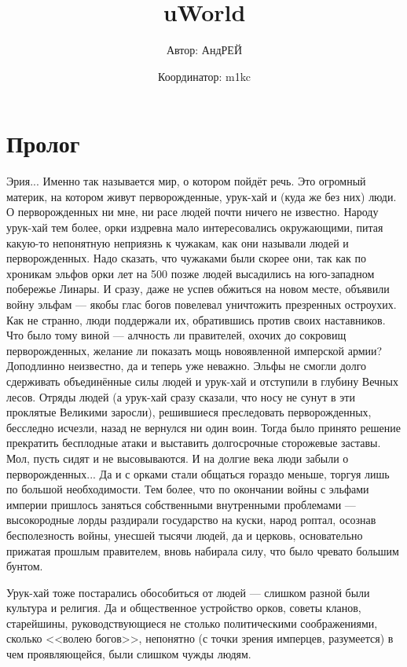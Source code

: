 \documentclass[12pt,a4paper]{book}
\title{\textbf{uWorld}}
\author{Автор: АндРЕЙ \and Координатор: m1kc}
\begin{document}
\maketitle

\chapter*{Пролог}

Эрия... Именно так называется мир, о котором пойдёт речь. Это огромный материк, на котором живут перворожденные, урук-хай и (куда же без них) люди. О перворожденных ни мне, ни расе людей почти ничего не известно. Народу урук-хай тем более, орки издревна мало интересовались окружающими, питая какую-то непонятную неприязнь к чужакам, как они называли людей и перворожденных. Надо сказать, что чужаками были скорее они, так как по хроникам эльфов орки лет на 500 позже людей высадились на юго-западном побережье Линары. И сразу, даже не успев обжиться на новом месте, объявили войну эльфам --- якобы глас богов повелевал уничтожить презренных остроухих. Как не странно, люди поддержали их, обратившись против своих наставников. Что было тому виной --- алчность ли правителей, охочих до сокровищ перворожденных, желание ли показать мощь новоявленной имперской армии? Доподлинно неизвестно, да и теперь уже неважно. Эльфы не смогли долго сдерживать объединённые силы людей и урук-хай и отступили в глубину Вечных лесов. Отряды людей (а урук-хай сразу сказали, что носу не сунут в эти проклятые Великими заросли), решившиеся преследовать перворожденных, бесследно исчезли, назад не вернулся ни один воин. Тогда было принято решение прекратить бесплодные атаки и выставить долгосрочные сторожевые заставы. Мол, пусть сидят и не высовываются. И на долгие века люди забыли о перворожденных... Да и с орками стали общаться гораздо меньше, торгуя лишь по большой необходимости. Тем более, что по окончании войны с эльфами империи пришлось заняться собственными внутренными проблемами --- высокородные лорды раздирали государство на куски, народ роптал, осознав бесполезность войны, унесшей тысячи людей, да и церковь, основательно прижатая прошлым правителем, вновь набирала силу, что было чревато большим бунтом.

Урук-хай тоже постарались обособиться от людей --- слишком разной были культура и религия. Да и общественное устройство орков, советы кланов, старейшины, руководствующиеся не столько политическими соображениями, сколько <<волею богов>>, непонятно (с точки зрения имперцев, разумеется) в чем проявляющейся, были слишком чужды людям.
\end{document}
